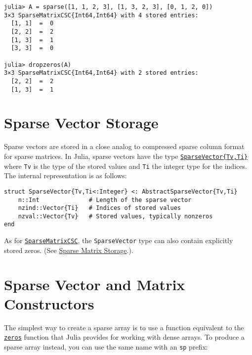 \begin{verbatim}
julia> A = sparse([1, 1, 2, 3], [1, 3, 2, 3], [0, 1, 2, 0])
3×3 SparseMatrixCSC{Int64,Int64} with 4 stored entries:
  [1, 1]  =  0
  [2, 2]  =  2
  [1, 3]  =  1
  [3, 3]  =  0

julia> dropzeros(A)
3×3 SparseMatrixCSC{Int64,Int64} with 2 stored entries:
  [2, 2]  =  2
  [1, 3]  =  1
\end{verbatim}



\hypertarget{13548669072623985320}{}


\section{Sparse Vector Storage}



Sparse vectors are stored in a close analog to compressed sparse column format for sparse matrices. In Julia, sparse vectors have the type \hyperlink{17594730109701296640}{\texttt{SparseVector\{Tv,Ti\}}} where \texttt{Tv} is the type of the stored values and \texttt{Ti} the integer type for the indices. The internal representation is as follows:




\begin{verbatim}
struct SparseVector{Tv,Ti<:Integer} <: AbstractSparseVector{Tv,Ti}
    n::Int              # Length of the sparse vector
    nzind::Vector{Ti}   # Indices of stored values
    nzval::Vector{Tv}   # Stored values, typically nonzeros
end
\end{verbatim}



As for \hyperlink{15099699527958384292}{\texttt{SparseMatrixCSC}}, the \texttt{SparseVector} type can also contain explicitly stored zeros. (See \hyperlink{4286524230912717228}{Sparse Matrix Storage}.).



\hypertarget{18437956336658039135}{}


\section{Sparse Vector and Matrix Constructors}



The simplest way to create a sparse array is to use a function equivalent to the \hyperlink{13837674686090348619}{\texttt{zeros}} function that Julia provides for working with dense arrays. To produce a sparse array instead, you can use the same name with an \texttt{sp} prefix:




